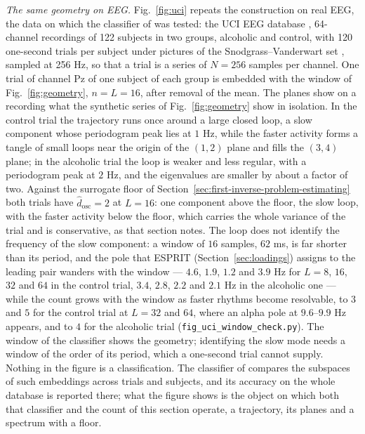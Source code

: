 \documentclass{article}
\begin{document}
\emph{The same geometry on EEG.} Fig.~\ref{fig:uci} repeats the construction on real EEG, the data on which the classifier of \cite{ref-Bernadotte10} was tested: the UCI EEG database \cite{ref-UCI, ref-Zhang95}, 64-channel recordings of 122 subjects in two groups, alcoholic and control, with 120 one-second trials per subject under pictures of the Snodgrass--Vanderwart set \cite{ref-Snodgrass}, sampled at 256 Hz, so that a trial is a series of $N = 256$ samples per channel. One trial of channel Pz of one subject of each group is embedded with the window of Fig.~\ref{fig:geometry}, $n = L = 16$, after removal of the mean. The planes show on a recording what the synthetic series of Fig.~\ref{fig:geometry} show in isolation. In the control trial the trajectory runs once around a large closed loop, a slow component whose periodogram peak lies at $1$ Hz, while the faster activity forms a tangle of small loops near the origin of the $(1, 2)$ plane and fills the $(3, 4)$ plane; in the alcoholic trial the loop is weaker and less regular, with a periodogram peak at $2$ Hz, and the eigenvalues are smaller by about a factor of two. Against the surrogate floor of Section~\ref{sec:first-inverse-problem-estimating} both trials have $\widehat{d}_{\mathrm{osc}} = 2$ at $L = 16$: one component above the floor, the slow loop, with the faster activity below the floor, which carries the whole variance of the trial and is conservative, as that section notes. The loop does not identify the frequency of the slow component: a window of $16$ samples, $62$ ms, is far shorter than its period, and the pole that ESPRIT (Section~\ref{sec:loadings}) assigns to the leading pair wanders with the window --- $4.6$, $1.9$, $1.2$ and $3.9$ Hz for $L = 8$, $16$, $32$ and $64$ in the control trial, $3.4$, $2.8$, $2.2$ and $2.1$ Hz in the alcoholic one --- while the count grows with the window as faster rhythms become resolvable, to $3$ and $5$ for the control trial at $L = 32$ and $64$, where an alpha pole at $9.6$--$9.9$ Hz appears, and to $4$ for the alcoholic trial (\texttt{fig\_uci\_window\_check.py}). The window of the classifier shows the geometry; identifying the slow mode needs a window of the order of its period, which a one-second trial cannot supply. Nothing in the figure is a classification. The classifier of \cite{ref-Bernadotte10} compares the subspaces of such embeddings across trials and subjects, and its accuracy on the whole database is reported there; what the figure shows is the object on which both that classifier and the count of this section operate, a trajectory, its planes and a spectrum with a floor.
\end{document}
